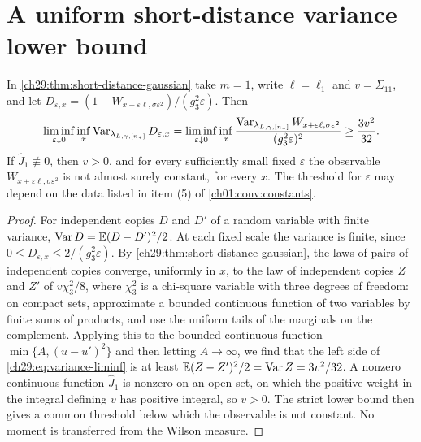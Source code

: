 \section{A uniform short-distance variance lower bound}\label{ch29:sec:variance}

\begin{corollary}\label{ch29:cor:short-distance-variance-liminf}
In \cref{ch29:thm:short-distance-gaussian} take $m=1$, write $\ell=\ell_1$ and $v=\Sigma_{11}$, and let $D_{\varepsilon,x}=(1-W_{x+\varepsilon\ell,\sigma\varepsilon^2})/(g_3^2\varepsilon)$. Then
\begin{equation}\label{ch29:eq:variance-liminf}
 \liminf_{\varepsilon\downarrow0}\inf_x\operatorname{Var}_{\lambda_{L,\gamma,[n_*]}}D_{\varepsilon,x}=\liminf_{\varepsilon\downarrow0}\inf_x\frac{\operatorname{Var}_{\lambda_{L,\gamma,[n_*]}}W_{x+\varepsilon\ell,\sigma\varepsilon^2}}{(g_3^2\varepsilon)^2}\ge\frac{3v^2}{32}.
\end{equation}
If $\widehat J_1\not\equiv0$, then $v>0$, and for every sufficiently small fixed $\varepsilon$ the observable $W_{x+\varepsilon\ell,\sigma\varepsilon^2}$ is not almost surely constant, for every $x$. The threshold for $\varepsilon$ may depend on the data listed in item (5) of \cref{ch01:conv:constants}.
\end{corollary}

\begin{proof}
For independent copies $D$ and $D'$ of a random variable with finite variance, $\operatorname{Var} D=\mathbb E(D-D')^2/2$. At each fixed scale the variance is finite, since $0\le D_{\varepsilon,x}\le2/(g_3^2\varepsilon)$. By \cref{ch29:thm:short-distance-gaussian}, the laws of pairs of independent copies converge, uniformly in $x$, to the law of independent copies $Z$ and $Z'$ of $v\chi_3^2/8$, where $\chi_3^2$ is a chi-square variable with three degrees of freedom: on compact sets, approximate a bounded continuous function of two variables by finite sums of products, and use the uniform tails of the marginals on the complement. Applying this to the bounded continuous function $\min\{A,(u-u')^2\}$ and then letting $A\to\infty$, we find that the left side of \eqref{ch29:eq:variance-liminf} is at least $\mathbb E(Z-Z')^2/2=\operatorname{Var} Z=3v^2/32$. A nonzero continuous function $\widehat J_1$ is nonzero on an open set, on which the positive weight in the integral defining $v$ has positive integral, so $v>0$. The strict lower bound then gives a common threshold below which the observable is not constant. No moment is transferred from the Wilson measure.
\end{proof}

